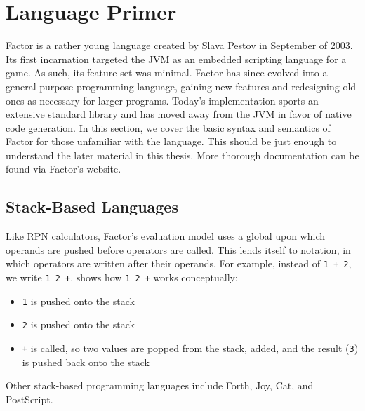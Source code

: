 \section{Language Primer}\label{sec:primer}


Factor is a rather young language created by Slava Pestov in September of 2003.
Its first incarnation targeted the \gls{JVM} as an embedded scripting language
for a game.  As such, its feature set was minimal.  Factor has since evolved
into a general-purpose programming language, gaining new features and
redesigning old ones as necessary for larger programs.  Today's implementation
sports an extensive standard library and has moved away from the \gls{JVM} in
favor of native code generation.  In this section, we cover the basic syntax and semantics of Factor for those
unfamiliar with the language.  This should be just enough to understand the
later material in this thesis.  More thorough documentation
can be found via Factor's website.

\subsection{Stack-Based Languages}\label{sec:primer:stack-based}


Like \gls{RPN} calculators, Factor's evaluation model uses a global
 upon which operands are pushed before operators are called.  This
lends itself to  notation, in which operators are written after
their operands.  For example, instead of \texttt{1~+~2}, we write
\texttt{1~2~+}.   shows how \texttt{1~2~+} works conceptually:
\begin{itemize}
  \item \texttt{1} is pushed onto the stack
  \item \texttt{2} is pushed onto the stack
  \item \texttt{+} is called, so two values are popped from the stack, added,
        and the result (\texttt{3}) is pushed back onto the stack
\end{itemize}
Other stack-based programming languages include Forth,
Joy, Cat, and PostScript.

